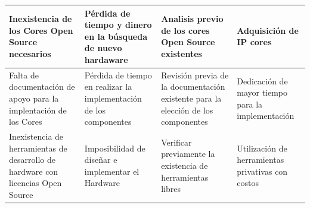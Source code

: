 \begin{table}[!h]
\begin{tabular}{ p{4cm} p{4cm} p{4cm} p{3cm} }
		\hline
		Inexistencia de los Cores Open Source necesarios& Pérdida de tiempo y dinero en la búsqueda de nuevo hardaware& Analisis previo de los cores Open Source existentes & Adquisición de IP cores\\
		\hline
		Falta de documentación de apoyo para la implentación de los Cores & Pérdida de tiempo en realizar la implementación de los componentes & Revisión previa de la documentación existente para la elección de los  componentes & Dedicación de mayor tiempo para la implementación\\ 
		\hline
		 Inexistencia de herramientas de desarrollo de hardware con licencias Open Source & Imposibilidad de diseñar e implementar el Hardware & Verificar previamente la existencia de herramientas libres & Utilización de herramientas privativas con costos\\
		\hline
		\end{tabular}
		\end{table}
		\newpage
